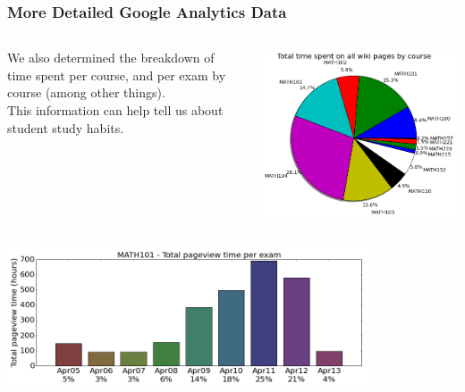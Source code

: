 \documentclass{beamer}
\begin{document}
\frame
{\frametitle{{\bf More Detailed Google Analytics Data}}
\begin{columns}
    \begin{column}{0.45\textwidth}
        We also determined the breakdown of time spent per course, and per exam by course (among other things).  \newline \\ This information can help tell us about student study habits.
    \end{column}
    \begin{column}{0.55\textwidth}
        \includegraphics[width=\textwidth]{course_time2.png}
    \end{column}
\end{columns}
\includegraphics[width=0.8\textwidth]{exams_101only2.png}
}
\end{document}
